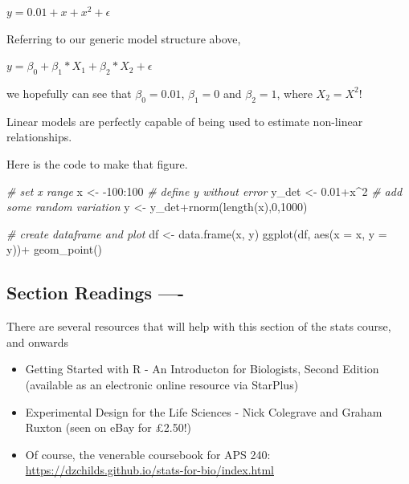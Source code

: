 \documentclass[
]{book}
\newenvironment{Shaded}{\begin{snugshade}}{\end{snugshade}}
\newcommand{\AttributeTok}[1]{\textcolor[rgb]{0.77,0.63,0.00}{#1}}
\newcommand{\CommentTok}[1]{\textcolor[rgb]{0.56,0.35,0.01}{\textit{#1}}}
\newcommand{\DecValTok}[1]{\textcolor[rgb]{0.00,0.00,0.81}{#1}}
\newcommand{\FloatTok}[1]{\textcolor[rgb]{0.00,0.00,0.81}{#1}}
\newcommand{\FunctionTok}[1]{\textcolor[rgb]{0.00,0.00,0.00}{#1}}
\newcommand{\NormalTok}[1]{#1}
\newcommand{\OtherTok}[1]{\textcolor[rgb]{0.56,0.35,0.01}{#1}}
\newcommand{\SpecialCharTok}[1]{\textcolor[rgb]{0.00,0.00,0.00}{#1}}
\providecommand{\tightlist}{%
  \setlength{\itemsep}{0pt}\setlength{\parskip}{0pt}}
\begin{document}
\(y = 0.01 + x + x^{2} + \epsilon\)

Referring to our generic model structure above,

\(y = \beta_{0}+\beta_{1}*X_{1}+\beta_{2}*X_{2}+\epsilon\)

we hopefully can see that \(\beta_{0} = 0.01\), \(\beta_{1} = 0\) and \(\beta_{2} = 1\), where \(X_{2} = X^{2}\)!

Linear models are perfectly capable of being used to estimate non-linear relationships.

Here is the code to make that figure.

\begin{Shaded}
\begin{Highlighting}[]
\CommentTok{\# set x range}
\NormalTok{x }\OtherTok{\textless{}{-}} \SpecialCharTok{{-}}\DecValTok{100}\SpecialCharTok{:}\DecValTok{100}
\CommentTok{\# define y without error}
\NormalTok{y\_det }\OtherTok{\textless{}{-}} \FloatTok{0.01}\SpecialCharTok{+}\NormalTok{x}\SpecialCharTok{\^{}}\DecValTok{2}
\CommentTok{\# add some random variation}
\NormalTok{y }\OtherTok{\textless{}{-}}\NormalTok{ y\_det}\SpecialCharTok{+}\FunctionTok{rnorm}\NormalTok{(}\FunctionTok{length}\NormalTok{(x),}\DecValTok{0}\NormalTok{,}\DecValTok{1000}\NormalTok{)}

\CommentTok{\# create dataframe and plot}
\NormalTok{df }\OtherTok{\textless{}{-}} \FunctionTok{data.frame}\NormalTok{(x, y)}
\FunctionTok{ggplot}\NormalTok{(df, }\FunctionTok{aes}\NormalTok{(}\AttributeTok{x =}\NormalTok{ x, }\AttributeTok{y =}\NormalTok{ y))}\SpecialCharTok{+}
  \FunctionTok{geom\_point}\NormalTok{()}
\end{Highlighting}
\end{Shaded}

\hypertarget{section-readings--}{%
\subsection{Section Readings ----}\label{section-readings--}}

There are several resources that will help with this section of the stats course, and onwards

\begin{itemize}
\tightlist
\item
  Getting Started with R - An Introducton for Biologists, Second Edition (available as an electronic online resource via StarPlus)
\item
  Experimental Design for the Life Sciences - Nick Colegrave and Graham Ruxton (seen on eBay for £2.50!)
\item
  Of course, the venerable coursebook for APS 240: \url{https://dzchilds.github.io/stats-for-bio/index.html}
\end{itemize}
\end{document}
